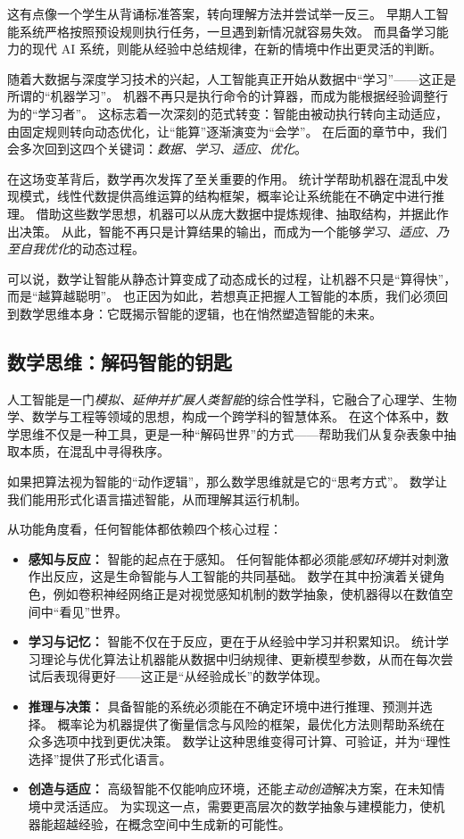 这有点像一个学生从背诵标准答案，转向理解方法并尝试举一反三。  
早期人工智能系统严格按照预设规则执行任务，一旦遇到新情况就容易失效。  
而具备学习能力的现代 AI 系统，则能从经验中总结规律，在新的情境中作出更灵活的判断。

随着大数据与深度学习技术的兴起，人工智能真正开始从数据中“学习”——这正是所谓的“机器学习”。
机器不再只是执行命令的计算器，而成为能根据经验调整行为的“学习者”。
这标志着一次深刻的范式转变：智能由被动执行转向主动适应，由固定规则转向动态优化，让“能算”逐渐演变为“会学”。
在后面的章节中，我们会多次回到这四个关键词：\emph{数据、学习、适应、优化}。  

在这场变革背后，数学再次发挥了至关重要的作用。
统计学帮助机器在混乱中发现模式，线性代数提供高维运算的结构框架，概率论让系统能在不确定中进行推理。
借助这些数学思想，机器可以从庞大数据中提炼规律、抽取结构，并据此作出决策。
从此，智能不再只是计算结果的输出，而成为一个能够\emph{学习、适应、乃至自我优化}的动态过程。

可以说，数学让智能从静态计算变成了动态成长的过程，让机器不只是“算得快”，而是“越算越聪明”。
也正因为如此，若想真正把握人工智能的本质，我们必须回到数学思维本身：它既揭示智能的逻辑，也在悄然塑造智能的未来。  

\subsection{数学思维：解码智能的钥匙}
人工智能是一门\emph{模拟、延伸并扩展人类智能}的综合性学科，它融合了心理学、生物学、数学与工程等领域的思想，构成一个跨学科的智慧体系。
在这个体系中，数学思维不仅是一种工具，更是一种“解码世界”的方式——帮助我们从复杂表象中抽取本质，在混乱中寻得秩序。

如果把算法视为智能的“动作逻辑”，那么数学思维就是它的“思考方式”。
数学让我们能用形式化语言描述智能，从而理解其运行机制。

从功能角度看，任何智能体都依赖四个核心过程：
\begin{itemize}
\item \textbf{感知与反应：} 智能的起点在于感知。  
任何智能体都必须能\emph{感知环境}并对刺激作出反应，这是生命智能与人工智能的共同基础。  
数学在其中扮演着关键角色，例如卷积神经网络正是对视觉感知机制的数学抽象，使机器得以在数值空间中“看见”世界。

\item \textbf{学习与记忆：} 智能不仅在于反应，更在于从经验中学习并积累知识。  
统计学习理论与优化算法让机器能从数据中归纳规律、更新模型参数，从而在每次尝试后表现得更好——这正是“从经验成长”的数学体现。

\item \textbf{推理与决策：} 具备智能的系统必须能在不确定环境中进行推理、预测并选择。
概率论为机器提供了衡量信念与风险的框架，最优化方法则帮助系统在众多选项中找到更优决策。
数学让这种思维变得可计算、可验证，并为“理性选择”提供了形式化语言。

\item \textbf{创造与适应：} 高级智能不仅能响应环境，还能\emph{主动创造}解决方案，在未知情境中灵活适应。  
为实现这一点，需要更高层次的数学抽象与建模能力，使机器能超越经验，在概念空间中生成新的可能性。
\end{itemize}

